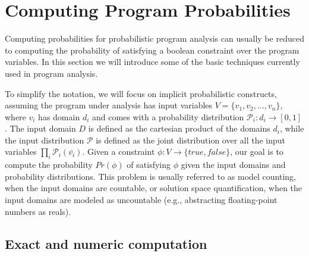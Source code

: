 \section{Computing Program Probabilities}
\label{sec:computingprobabilities}



Computing probabilities for probabilistic program analysis can usually be reduced to computing the probability of satisfying a boolean constraint over the program variables. In this section we will introduce some of the basic techniques currently used in program analysis. 

To simplify the notation, we will focus on implicit probabilistic constructs, assuming the program under analysis has input variables $V=\{v_1, v_2, \dots, v_n\}$, where $v_i$ has domain $d_i$ and comes with a probability distribution $\mathcal{P}_i: d_i \to [0, 1]$. The input domain $D$ is defined as the cartesian product of the domains $d_i$, while the input distribution $\mathcal{P}$ is defined as the joint distribution over all the input variables $\prod_i \mathcal{P}_i(\bar{v_i})$. Given a constraint $\phi: V \to \{true, false\}$, our goal is to compute the probability $Pr(\phi)$ of satisfying $\phi$ given the input domains and probability distributions. This problem is usually referred to as model counting, when the input domains are countable, or solution space quantification, when the input domains are modeled as uncountable (e.g., abstracting floating-point numbers as reals).





\subsection{Exact and numeric computation}\label{sec:computingprobabilitiesExact}

